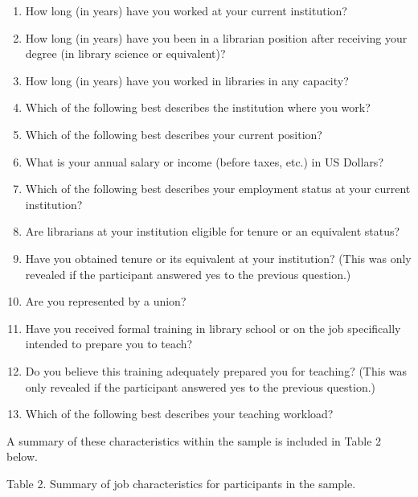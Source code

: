 \documentclass[
  twocolumn]{article}
\providecommand{\tightlist}{%
  \setlength{\itemsep}{0pt}\setlength{\parskip}{0pt}}
\begin{document}
\begin{enumerate}
\def\labelenumi{\arabic{enumi}.}
\tightlist
\item
  How long (in years) have you worked at your current institution?
\item
  How long (in years) have you been in a librarian position after
  receiving your degree (in library science or equivalent)?
\item
  How long (in years) have you worked in libraries in any capacity?
\item
  Which of the following best describes the institution where you work?
\item
  Which of the following best describes your current position?
\item
  What is your annual salary or income (before taxes, etc.) in US
  Dollars?
\item
  Which of the following best describes your employment status at your
  current institution?
\item
  Are librarians at your institution eligible for tenure or an
  equivalent status?
\item
  Have you obtained tenure or its equivalent at your institution? (This
  was only revealed if the participant answered yes to the previous
  question.)
\item
  Are you represented by a union?
\item
  Have you received formal training in library school or on the job
  specifically intended to prepare you to teach?
\item
  Do you believe this training adequately prepared you for teaching?
  (This was only revealed if the participant answered yes to the
  previous question.)
\item
  Which of the following best describes your teaching workload?
\end{enumerate}

A summary of these characteristics within the sample is included in
Table 2 below.

Table 2. Summary of job characteristics for participants in the sample.
\end{document}
